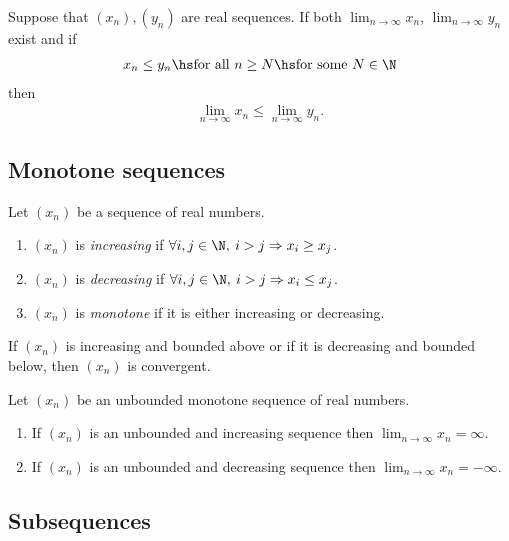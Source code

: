 \documentclass{article}
\begin{document}
\begin{theorem}
    Suppose that $(x_n),(y_n)$ are real sequences. If both $\lim_{n\to\infty}x_n$, $\lim_{n\to\infty}y_n$
    exist and if
    \begin{align*}
        x_n\leq y_n \hs \text{for all } n\geq N \hs \text{for some }N\in\N
    \end{align*}
    then
    \begin{align*}
        \lim_{n\to\infty}x_n\leq \lim_{n\to\infty}y_n.
    \end{align*}
\end{theorem}

\subsection{Monotone sequences}

\begin{definition}
    Let $(x_n)$ be a sequence of real numbers.
    \begin{enumerate}
        \item $(x_n)$ is \emph{increasing} if $\forall i,j\in\N,\: i>j \Rightarrow x_i \geq x_j$.
        \item $(x_n)$ is \emph{decreasing} if $\forall i,j\in\N,\: i>j \Rightarrow x_i \leq x_j$.
        \item $(x_n)$ is \emph{monotone} if it is either increasing or decreasing.
    \end{enumerate}
\end{definition}

\begin{theorem}
    If $(x_n)$ is increasing and bounded above or if it is decreasing and bounded below, then
    $(x_n)$ is convergent.
\end{theorem}

\setcounter{theorem}{3}
\begin{theorem}
    Let $(x_n)$ be an unbounded monotone sequence of real numbers.
    \begin{enumerate}
        \item If $(x_n)$ is an unbounded and increasing sequence then $\lim_{n\to\infty} x_n = \infty$.
        \item If $(x_n)$ is an unbounded and decreasing sequence then $\lim_{n\to\infty} x_n = -\infty$.
    \end{enumerate}
\end{theorem}

\subsection{Subsequences}
\end{document}
